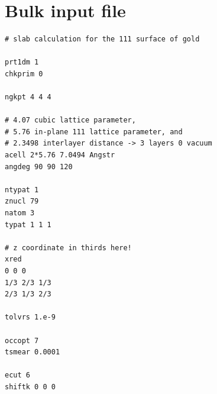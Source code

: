 \documentclass{report}
\begin{document}
\section{Bulk input file}
\begin{verbatim}
# slab calculation for the 111 surface of gold

prt1dm 1
chkprim 0

ngkpt 4 4 4

# 4.07 cubic lattice parameter,
# 5.76 in-plane 111 lattice parameter, and
# 2.3498 interlayer distance -> 3 layers 0 vacuum
acell 2*5.76 7.0494 Angstr
angdeg 90 90 120

ntypat 1
znucl 79
natom 3
typat 1 1 1

# z coordinate in thirds here!
xred
0 0 0
1/3 2/3 1/3
2/3 1/3 2/3

tolvrs 1.e-9

occopt 7
tsmear 0.0001

ecut 6
shiftk 0 0 0
\end{verbatim}
\end{document}
